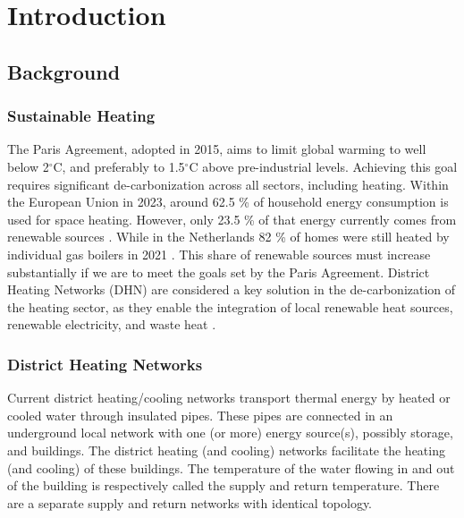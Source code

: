 \chapter{Introduction}
\label{chapter:introduction}
\section{Background}
\subsection{Sustainable Heating}
The Paris Agreement, adopted in 2015, aims to limit global warming to well below 2$^{\circ}\text{C}$, and preferably to 1.5$^{\circ}\text{C}$ above pre-industrial levels. Achieving this goal requires significant de-carbonization across all sectors, including heating. Within the European Union in 2023, around 62.5 \% of household energy consumption is used for space heating. However, only 23.5 \% of that energy currently comes from renewable sources \cite{EUenergie}. While in the Netherlands 82 \% of homes were still heated by individual gas boilers in 2021 \cite{NLenergie}.
This share of renewable sources must increase substantially if we are to meet the goals set by the Paris Agreement. District Heating Networks (DHN) are considered a key solution in the de-carbonization of the heating sector, as they enable the integration of local renewable heat sources, renewable electricity, and waste heat \cite{KUNTUAROVA}.

\subsection{District Heating Networks}
Current district heating/cooling networks transport thermal energy by heated or cooled water through insulated pipes. These pipes are connected in an underground local network with one (or more) energy source(s), possibly storage, and buildings. The district heating (and cooling) networks facilitate the heating (and cooling) of these buildings. The temperature of the water flowing in and out of the building is respectively called the supply and return temperature. There are a separate supply and return networks with identical topology. 

